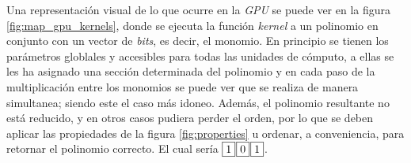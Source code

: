 Una representación visual de lo que ocurre en la \textit{GPU} se puede ver en la figura \ref{fig:map_gpu_kernels}, donde se ejecuta la función \textit{kernel} a un polinomio en conjunto con un vector de \textit{bits}, es decir, el monomio. En principio se tienen los parámetros globlales y accesibles para todas las unidades de cómputo, a ellas se les ha asignado una sección determinada del polinomio y en cada paso de la multiplicación entre los monomios se puede ver que se realiza de manera simultanea; siendo este el caso más idoneo. Además, el polinomio resultante no está reducido, y en otros casos pudiera perder el orden, por lo que se deben aplicar las propiedades de la figura \ref{fig:properties} u ordenar, a conveniencia, para retornar el polinomio correcto. El cual sería $\fcolorbox{black}{white}{1} \sep \fcolorbox{black}{white}{0} \sep \fcolorbox{black}{white}{1}$.
